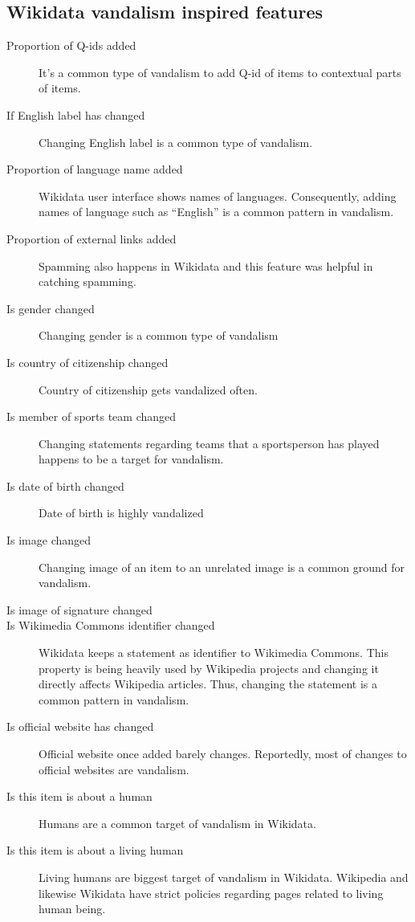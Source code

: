 \documentclass{sig-alternate}
\begin{document}
\subsection{Wikidata vandalism inspired features}
\begin{description}
\item[Proportion of Q-ids added] It's a common type of vandalism to add Q-id of items to contextual parts of items.
\item[If English label has changed] Changing English label is a common type of vandalism.
\item[Proportion of language name added]  Wikidata user interface shows names of languages. Consequently, adding names of language such as ``English'' is a common pattern in vandalism.
\item[Proportion of external links added]  Spamming also happens in Wikidata and this feature was helpful in catching spamming.
\item[Is gender changed] Changing gender is a common type of vandalism
\item[Is country of citizenship changed]  Country of citizenship gets vandalized often.
\item[Is member of sports team changed] Changing statements regarding teams that a sportsperson has played happens to be a target for vandalism.
\item[Is date of birth changed]  Date of birth is highly vandalized
\item[Is image changed]  Changing image of an item to an unrelated image is a common ground for vandalism.
\item[Is image of signature changed]
\item[Is Wikimedia Commons identifier changed]  Wikidata keeps a statement as identifier to Wikimedia Commons. This property is being heavily used by Wikipedia projects and changing it directly affects Wikipedia articles. Thus, changing the statement is a common pattern in vandalism.
\item[Is official website has changed]  Official website once added barely changes. Reportedly, most of changes to official websites are vandalism.
\item[Is this item is about a human]  Humans are a common target of vandalism in Wikidata.
\item[Is this item is about a living human]  Living humans are biggest target of vandalism in Wikidata. Wikipedia and likewise Wikidata have strict policies regarding pages related to living human being.
\end{description}
\end{document}
